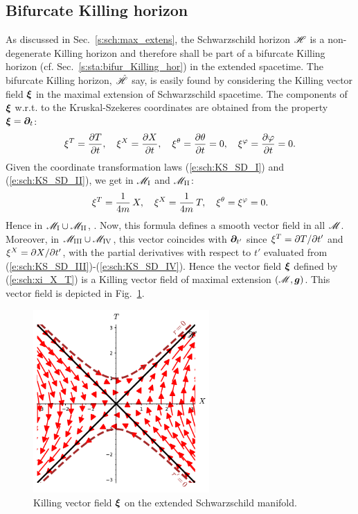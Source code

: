 \subsection{Bifurcate Killing horizon} \label{s:max:bifur_Kill_hor}

As discussed in Sec.~\ref{s:sch:max_extens}, the Schwarzschild horizon
$\mathscr{H}$ is
a non-degenerate Killing horizon and therefore shall be part of
a bifurcate Killing horizon (cf. Sec.~\ref{s:sta:bifur_Killing_hor})
in the extended spacetime.
The bifurcate Killing horizon, $\hat{\mathscr{H}}$ say, is easily found by
considering the Killing vector field $\bm{\xi}$ in the maximal extension
of Schwarzschild spacetime. The components of $\bm{\xi}$ w.r.t. to the
Kruskal-Szekeres coordinates are obtained from the
property $\bm{\xi} = \bm{\partial}_t$:
\[
    \xi^T = \frac{\partial T}{\partial t}, \quad
    \xi^X = \frac{\partial X}{\partial t}, \quad
    \xi^\theta = \frac{\partial \theta}{\partial t} = 0, \quad
    \xi^\varphi = \frac{\partial \varphi}{\partial t} = 0 .
\]
Given the coordinate transformation laws (\ref{e:sch:KS_SD_I})
and (\ref{e:sch:KS_SD_II}), we get in
$\mathscr{M}_{\rm I}$ and $\mathscr{M}_{\rm II}$:
\[
    \xi^T = \frac{1}{4m} \, X, \quad
    \xi^X = \frac{1}{4m} \, T , \quad
    \xi^\theta = \xi^\varphi = 0 .
\]
Hence in $\mathscr{M}_{\rm I}\cup\mathscr{M}_{\rm II}$,
\be \label{e:sch:xi_X_T}
    .
\ee
Now, this formula defines a smooth vector field in all $\mathscr{M}$.
Moreover, in $\mathscr{M}_{\rm III}\cup\mathscr{M}_{\rm IV}$, this vector coincides with
$\bm{\partial}_{t'}$ since $\xi^T = {\partial T}/{\partial t'}$ and $\xi^X = {\partial X}/{\partial t'}$,
with the partial derivatives with respect to $t'$ evaluated from
(\ref{e:sch:KS_SD_III})-(\ref{e:sch:KS_SD_IV}). Hence the vector field
$\bm{\xi}$ defined by (\ref{e:sch:xi_X_T}) is a Killing vector field
of maximal extension $(\mathscr{M},\bm{g})$. This vector field is depicted in
Fig.~\ref{f:sch:xi_extend}.

\begin{figure}
\centerline{\includegraphics[width=0.6\textwidth]{max_xi_extend.pdf}}
\caption[]{\label{f:sch:xi_extend} \footnotesize
Killing vector field $\bm{\xi}$ on the extended Schwarzschild manifold.}
\end{figure}


